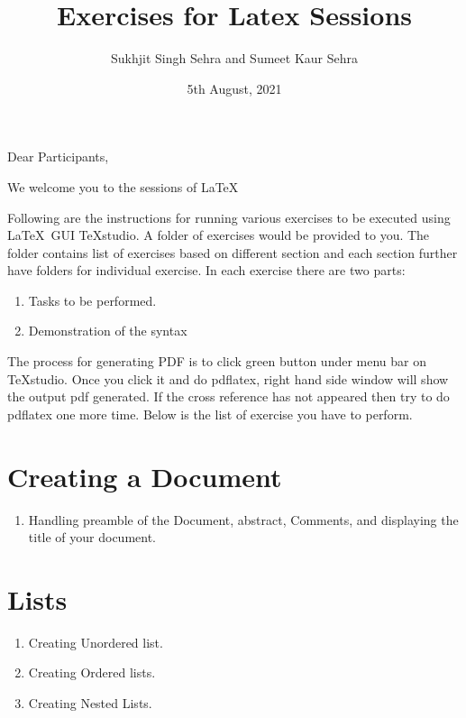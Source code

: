 \documentclass[11pt,a4paper]{article}
\author{Sukhjit Singh Sehra and Sumeet Kaur Sehra}
\title{Exercises for Latex Sessions}
\date{5th August, 2021}
\begin{document}
\maketitle
Dear Participants,

We welcome you to the  sessions of \LaTeX\



Following are the instructions for running various exercises to be executed using \LaTeX\ GUI \TeX studio. A folder of exercises would be provided to you. The folder contains list of exercises based on different section and each section further have folders for individual exercise. In each exercise there are two parts:
\begin{enumerate}
\item  Tasks to be performed.
\item Demonstration of the syntax
\end{enumerate}

The process for generating PDF is to click green button under menu bar on \TeX studio. Once you click it and do pdflatex, right hand side window will  show the output pdf generated. If the cross reference has not appeared then try to do pdflatex one more time. Below is the list of exercise you have to perform.

 
\section{Creating a Document}
 \begin{enumerate}
 \item Handling preamble of the Document, abstract, Comments, and displaying the title of your document. 
 
 \end{enumerate}
\section{Lists}
 \begin{enumerate}
 \item Creating Unordered list.
 \item Creating Ordered lists.
 \item Creating Nested Lists.
 \end{enumerate}
\end{document}
